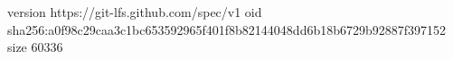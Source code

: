 version https://git-lfs.github.com/spec/v1
oid sha256:a0f98c29caa3c1bc653592965f401f8b82144048dd6b18b6729b92887f397152
size 60336
